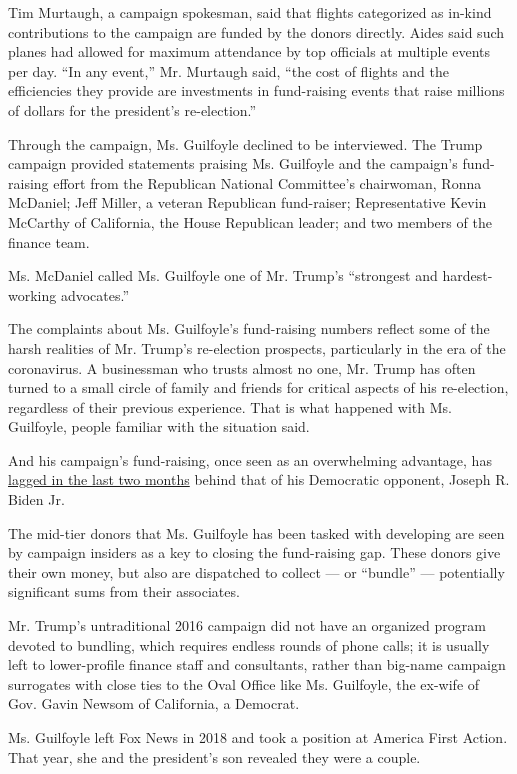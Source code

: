 Tim Murtaugh, a campaign spokesman, said that flights categorized as
in-kind contributions to the campaign are funded by the donors directly.
Aides said such planes had allowed for maximum attendance by top
officials at multiple events per day. ``In any event,'' Mr. Murtaugh
said, ``the cost of flights and the efficiencies they provide are
investments in fund-raising events that raise millions of dollars for
the president's re-election.''

Through the campaign, Ms. Guilfoyle declined to be interviewed. The
Trump campaign provided statements praising Ms. Guilfoyle and the
campaign's fund-raising effort from the Republican National Committee's
chairwoman, Ronna McDaniel; Jeff Miller, a veteran Republican
fund-raiser; Representative Kevin McCarthy of California, the House
Republican leader; and two members of the finance team.

Ms. McDaniel called Ms. Guilfoyle one of Mr. Trump's ``strongest and
hardest-working advocates.''

The complaints about Ms. Guilfoyle's fund-raising numbers reflect some
of the harsh realities of Mr. Trump's re-election prospects,
particularly in the era of the coronavirus. A businessman who trusts
almost no one, Mr. Trump has often turned to a small circle of family
and friends for critical aspects of his re-election, regardless of their
previous experience. That is what happened with Ms. Guilfoyle, people
familiar with the situation said.

And his campaign's fund-raising, once seen as an overwhelming advantage,
has
\href{https://www.nytimes3xbfgragh.onion/2020/07/01/us/politics/trump-fundraising-2020.html}{lagged
in the last two months} behind that of his Democratic opponent, Joseph
R. Biden Jr.

The mid-tier donors that Ms. Guilfoyle has been tasked with developing
are seen by campaign insiders as a key to closing the fund-raising gap.
These donors give their own money, but also are dispatched to collect
--- or ``bundle'' --- potentially significant sums from their
associates.

Mr. Trump's untraditional 2016 campaign did not have an organized
program devoted to bundling, which requires endless rounds of phone
calls; it is usually left to lower-profile finance staff and
consultants, rather than big-name campaign surrogates with close ties to
the Oval Office like Ms. Guilfoyle, the ex-wife of Gov. Gavin Newsom of
California, a Democrat.

Ms. Guilfoyle left Fox News in 2018 and took a position at America First
Action. That year, she and the president's son revealed they were a
couple.

